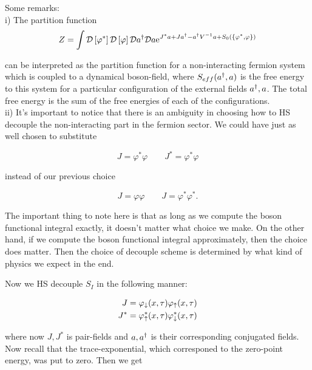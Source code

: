 Some remarks: \\

i) The partition function \\

\begin{equation*}
    Z = \int \mathcal{D} \left[ \varphi^*\right] \mathcal{D} \left[\varphi\right]\mathcal{D} a^{\dagger} \mathcal{D} a \mathrm{e}^{J^* a + J a^{\dagger} - a^{\dagger} V^{-1}a + S_0(\{\varphi^*,\varphi \})}
\end{equation*}

can be interpreted as the partition function for a non-interacting fermion system which is coupled to a dynamical boson-field, where $S_{eff}(a^{\dagger}, a)$ is the free energy to this system for a particular configuration of the external fields $a^{\dagger},a$. The total free energy is the sum of the free energies of each of the configurations. \\ 

ii) It's important to notice that there is an ambiguity in choosing how to HS decouple the non-interacting part in the fermion sector. We could have just as well chosen to substitute 

\begin{equation*}
    J = \varphi^* \varphi \quad \quad J^* = \varphi^* \varphi
\end{equation*}

instead of our previous choice 

\begin{equation*}
    J = \varphi \varphi \quad \quad J = \varphi^* \varphi^*. 
\end{equation*}

The important thing to note here is that as long as we compute the boson functional integral exactly, it doesn't matter what choice we make. On the other hand, if we compute the boson functional integral approximately, then the choice does matter. Then the choice of decouple scheme is determined by what kind of physics we expect in the end. 

Now we HS decouple $S_I$ in the following manner: 

\begin{align*}
    J = \varphi_\downarrow(x,\tau) \varphi_\uparrow(x, \tau) \\
    J^* = \varphi_\uparrow^*(x,\tau) \varphi_\downarrow^*(x,\tau) 
\end{align*}

where now $J, J^*$ is pair-fields and $a, a^{\dagger}$ is their corresponding conjugated fields. Now recall that the trace-exponential, which corresponed to the zero-point energy, was put to zero. Then we get 

